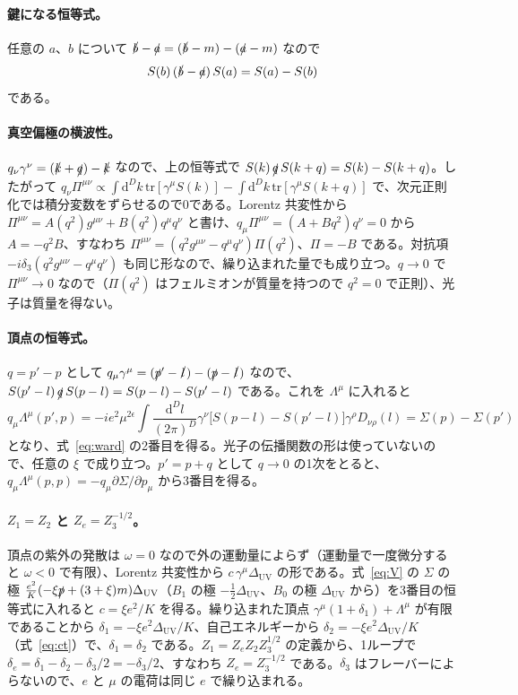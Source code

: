 \documentclass[a4paper,10pt]{ltjsarticle}
\newcommand{\dd}{\mathrm{d}}
\newcommand{\DUV}{\Delta_{\mathrm{UV}}}
\begin{document}
\paragraph{鍵になる恒等式。}任意の $a$、$b$ について $\slashed b-\slashed a=(\slashed b-m)-(\slashed a-m)$ なので
\begin{equation*}
S(b)\,(\slashed b-\slashed a)\,S(a)=S(a)-S(b)
\end{equation*}
である。

\paragraph{真空偏極の横波性。}$q_\nu\gamma^\nu=(\slashed k+\slashed q)-\slashed k$ なので、上の恒等式で $S(k)\,\slashed q\,S(k+q)=S(k)-S(k+q)$。したがって $q_\nu\Pi^{\mu\nu}\propto\int\dd^Dk\,\mathrm{tr}[\gamma^\mu S(k)]-\int\dd^Dk\,\mathrm{tr}[\gamma^\mu S(k+q)]$ で、次元正則化では積分変数をずらせるので0である。Lorentz 共変性から $\Pi^{\mu\nu}=A(q^2)g^{\mu\nu}+B(q^2)q^\mu q^\nu$ と書け、$q_\mu\Pi^{\mu\nu}=(A+Bq^2)q^\nu=0$ から $A=-q^2B$、すなわち $\Pi^{\mu\nu}=(q^2g^{\mu\nu}-q^\mu q^\nu)\Pi(q^2)$、$\Pi=-B$ である。対抗項 $-i\delta_3(q^2g^{\mu\nu}-q^\mu q^\nu)$ も同じ形なので、繰り込まれた量でも成り立つ。$q\to0$ で $\Pi^{\mu\nu}\to0$ なので（$\Pi(q^2)$ はフェルミオンが質量を持つので $q^2=0$ で正則）、光子は質量を得ない。

\paragraph{頂点の恒等式。}$q=p'-p$ として $q_\mu\gamma^\mu=(\slashed p'-\slashed l)-(\slashed p-\slashed l)$ なので、$S(p'-l)\,\slashed q\,S(p-l)=S(p-l)-S(p'-l)$ である。これを $\Lambda^\mu$ に入れると
\begin{equation*}
q_\mu\Lambda^\mu(p',p)=-ie^2\mu^{2\epsilon}\int\frac{\dd^Dl}{(2\pi)^D}\gamma^\nu\bigl[S(p-l)-S(p'-l)\bigr]\gamma^\rho D_{\nu\rho}(l)=\Sigma(p)-\Sigma(p')
\end{equation*}
となり、式~\eqref{eq:ward} の2番目を得る。光子の伝播関数の形は使っていないので、任意の $\xi$ で成り立つ。$p'=p+q$ として $q\to0$ の1次をとると、$q_\mu\Lambda^\mu(p,p)=-q_\mu\partial\Sigma/\partial p_\mu$ から3番目を得る。

\paragraph{$Z_1=Z_2$ と $Z_e=Z_3^{-1/2}$。}頂点の紫外の発散は $\omega=0$ なので外の運動量によらず（運動量で一度微分すると $\omega<0$ で有限）、Lorentz 共変性から $c\,\gamma^\mu\DUV$ の形である。式~\eqref{eq:V} の $\Sigma$ の極 $\frac{e^2}{K}(-\xi\slashed p+(3+\xi)m)\DUV$（$B_1$ の極 $-\frac12\DUV$、$B_0$ の極 $\DUV$ から）を3番目の恒等式に入れると $c=\xi e^2/K$ を得る。繰り込まれた頂点 $\gamma^\mu(1+\delta_1)+\Lambda^\mu$ が有限であることから $\delta_1=-\xi e^2\DUV/K$、自己エネルギーから $\delta_2=-\xi e^2\DUV/K$（式~\eqref{eq:ct}）で、$\delta_1=\delta_2$ である。$Z_1=Z_eZ_2Z_3^{1/2}$ の定義から、1ループで $\delta_e=\delta_1-\delta_2-\delta_3/2=-\delta_3/2$、すなわち $Z_e=Z_3^{-1/2}$ である。$\delta_3$ はフレーバーによらないので、$e$ と $\mu$ の電荷は同じ $e$ で繰り込まれる。
\end{document}
